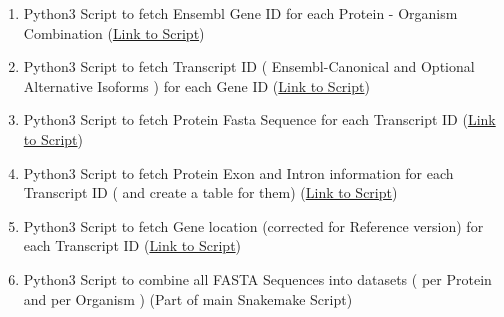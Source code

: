 \documentclass{book}
\begin{document}
\begin{enumerate}

  \item Python3 Script to fetch Ensembl Gene ID for each Protein - Organism Combination (\href{https://github.com/johnpatramanis/Proteomic_Pipeline/blob/main/Dataset_Initialization/Python_Scripts/Get_Gene_ID.py}{Link to Script})
  \item Python3 Script to fetch Transcript ID  ( Ensembl-Canonical and Optional Alternative Isoforms ) for each Gene ID (\href{https://github.com/johnpatramanis/Proteomic_Pipeline/blob/main/Dataset_Initialization/Python_Scripts/Search_Ensembl.py}{Link to Script})
  \item Python3 Script to fetch Protein Fasta Sequence for each Transcript ID (\href{https://github.com/johnpatramanis/Proteomic_Pipeline/blob/main/Dataset_Initialization/Python_Scripts/Get_Prot_Sequence_Ensembl.py}{Link to Script})
  \item Python3 Script to fetch Protein Exon and Intron information for each Transcript ID ( and create a table for them) (\href{https://github.com/johnpatramanis/Proteomic_Pipeline/blob/main/Dataset_Initialization/Python_Scripts/Get_Exon_Intron_Table.py}{Link to Script})
  \item Python3 Script to fetch Gene location (corrected for Reference version) for each Transcript ID (\href{https://github.com/johnpatramanis/Proteomic_Pipeline/blob/main/Dataset_Initialization/Python_Scripts/Get_Assembly_Location.py}{Link to Script})
  \item Python3 Script to combine all FASTA Sequences into datasets ( per Protein and per Organism ) (Part of main Snakemake Script)
\end{enumerate}

\vspace{1cm}
\end{document}
